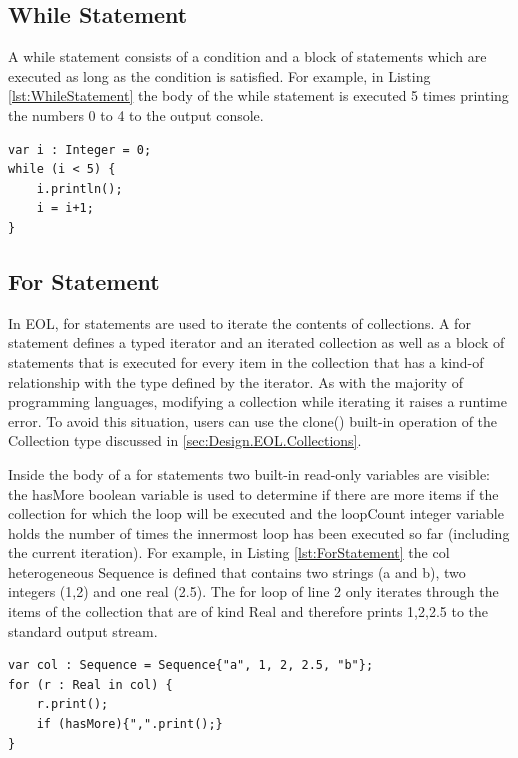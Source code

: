 \subsection{While Statement}
 
A while statement consists of a condition and a block of statements which are executed as long as the condition is satisfied. For example, in Listing \ref{lst:WhileStatement} the body of the while statement is executed 5 times printing the numbers 0 to 4 to the output console.

\begin{lstlisting}[basicstyle=\ttfamily\footnotesize, flexiblecolumns=true, numbers=none, nolol=true, caption=Example of a while statement, label=lst:WhileStatement, numbers=left, language=EOL, tabsize=2]
var i : Integer = 0;
while (i < 5) {
	i.println();
	i = i+1;
}
\end{lstlisting}

\subsection{For Statement}

In EOL, for statements are used to iterate the contents of collections. A for statement defines a typed iterator and an iterated collection as well as a block of statements that is executed for every item in the collection that has a kind-of relationship with the type defined by the iterator. As with the majority of programming languages, modifying a collection while iterating it raises a runtime error. To avoid this situation, users can use the clone() built-in operation of the Collection type discussed in \ref{sec:Design.EOL.Collections}.

Inside the body of a for statements two built-in read-only variables are visible: the hasMore boolean variable is used to determine if there are more items if the collection for which the loop will be executed and the loopCount integer variable holds the number of times the innermost loop has been executed so far (including the current iteration). For example, in Listing \ref{lst:ForStatement} the col heterogeneous Sequence is defined that contains two strings (a and b), two integers (1,2) and one real (2.5). The for loop of line 2 only iterates through the items of the collection that are of kind Real and therefore prints 1,2,2.5 to the standard output stream.

\begin{lstlisting}[basicstyle=\ttfamily\footnotesize, flexiblecolumns=true, numbers=none, nolol=true, caption=Example of a for statement, label=lst:ForStatement, numbers=left, language=EOL, tabsize=2]
var col : Sequence = Sequence{"a", 1, 2, 2.5, "b"};
for (r : Real in col) {
	r.print();
	if (hasMore){",".print();}
}
\end{lstlisting}

